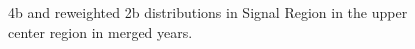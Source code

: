 \begin{figure}[ht]
 
 
    \caption{4b and reweighted 2b distributions in Signal Region in the upper center region in merged years.}
    \label{fig:upper-center-4bvbf-SR-all}
\end{figure}


